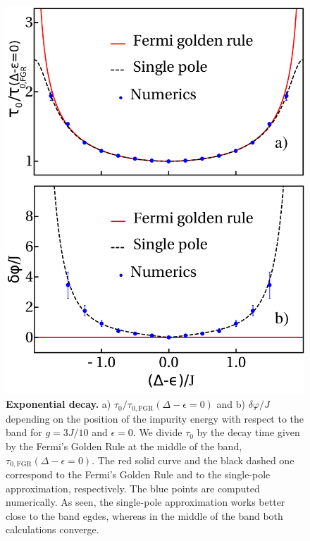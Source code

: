 \documentclass[aps,pra,twocolumn,floatfix,superscriptaddress]{revtex4-1}%
\begin{document}
\begin{figure}[thb!]
\includegraphics[width=1.0\columnwidth]{gamma_phi_g_0_3.pdf}
\caption{{\bf Exponential decay.} a) $\tau_0/\tau_{0,\text{FGR}}(\Delta-\epsilon=0)$ and b) $\delta\varphi/J$ depending on the position of the impurity energy with respect to the band for $g=3J/10$ and $\epsilon=0$. {\color{blue}We divide $\tau_0$ by the decay time given by the Fermi's Golden Rule at the middle of the band, $\tau_{0,\text{FGR}}(\Delta-\epsilon=0)$. The red solid curve and the black dashed one correspond to the Fermi's Golden Rule and to the single-pole approximation, respectively.} The blue points are computed numerically. As seen, the single-pole approximation works better close to the band egdes, whereas in the middle of the band both calculations converge.}\label{fig:qubit_decay}
\end{figure}
\end{document}
